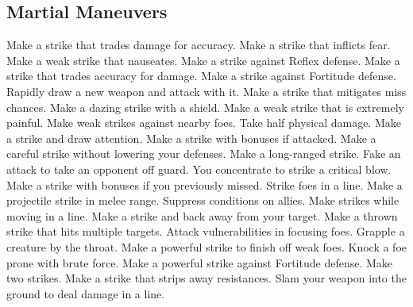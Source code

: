 \subsection{Martial Maneuvers}\label{Martial Maneuvers}
\begin{spelllist}
 Make a strike that trades damage for accuracy.
 Make a strike that inflicts fear.
 Make a weak strike that nauseates.
 Make a strike against Reflex defense.
 Make a strike that trades accuracy for damage.
 Make a strike against Fortitude defense.
 Rapidly draw a new weapon and attack with it.
 Make a strike that mitigates miss chances.
 Make a dazing strike with a shield.
 Make a weak strike that is extremely painful.
 Make weak strikes against nearby foes.
 Take half physical damage.
 Make a strike and draw attention.
 Make a strike with bonuses if attacked.
 Make a careful strike without lowering your defenses.
 Make a long-ranged strike.
 Fake an attack to take an opponent off guard.
 You concentrate to strike a critical blow.
 Make a strike with bonuses if you previously missed.
 Strike foes in a line.
 Make a projectile strike in melee range.
 Suppress conditions on allies.
 Make strikes while moving in a line.
 Make a strike and back away from your target.
 Make a thrown strike that hits multiple targets.
 Attack vulnerabilities in focusing foes.
 Grapple a creature by the throat.
 Make a powerful strike to finish off weak foes.
 Knock a foe prone with brute force.
 Make a powerful strike against Fortitude defense.
 Make two strikes.
 Make a strike that strips away resistances.
 Slam your weapon into the ground to deal damage in a line.

\end{spelllist}
